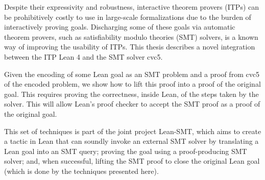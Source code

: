 Despite their expressivity and robustness, interactive theorem provers (ITPs)
can be prohibitively costly to use in large-scale formalizations due to the burden of
interactively proving goals.
%
Discharging some of these goals via automatic theorem provers, such as
satisfiability modulo theories (SMT) solvers, is a known way of improving the
usability of ITPs.
%
This thesis describes a novel integration between the ITP
Lean 4 and the SMT solver cvc5.

Given the encoding of some Lean goal as an SMT problem and a proof from
cvc5 of the encoded problem, we show how to lift this proof into a proof
of the original goal.
%
This requires proving the correctness, inside Lean, of the steps taken by the
solver. This will allow Lean's proof checker to accept the SMT proof as a
proof of the original goal.

This set of techniques is part of the joint project Lean-SMT, which aims to create a
tactic in Lean that can soundly invoke an external SMT solver by translating a Lean
goal into an SMT query; proving the goal using a proof-producing SMT solver; and,
when successful, lifting the SMT proof to close the original Lean goal
(which is done by the techniques presented here).
